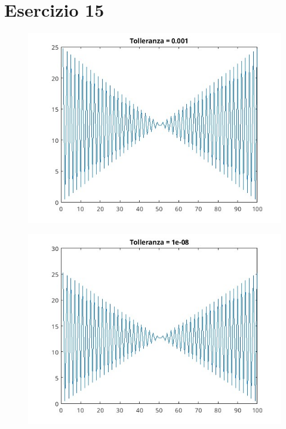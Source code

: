 \documentclass[10pt,a4paper]{article}
\begin{document}
\section*{Esercizio 15}
\begin{figure}[h!]
  \centering
  \includegraphics[width=1\textwidth]{../figure/15/tol1e-3.jpg}    
\end{figure}
\begin{figure}[h!]
  \centering
  \includegraphics[width=1\textwidth]{../figure/15/tol1e-8.jpg}    
\end{figure}
\end{document}
